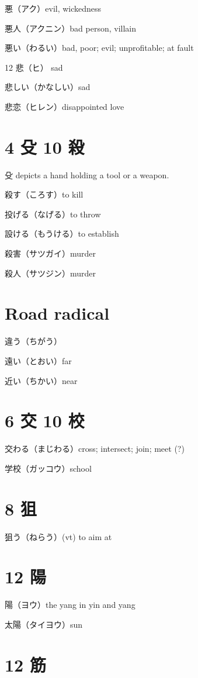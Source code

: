 悪（アク）evil, wickedness

悪人（アクニン）bad person, villain

悪い（わるい）bad, poor; evil; unprofitable; at fault

12 悲（ヒ） sad

悲しい（かなしい）sad

悲恋（ヒレン）disappointed love

\section{4 殳 10 殺}

殳 depicts a hand holding a tool or a weapon.

殺す（ころす）to kill

投げる（なげる）to throw

設ける（もうける）to establish

殺害（サツガイ）murder

殺人（サツジン）murder

\section{Road radical}

違う（ちがう）

遠い（とおい）far

近い（ちかい）near

\section{6 交 10 校}

交わる（まじわる）cross; intersect; join; meet (?)

学校（ガッコウ）school

\section{8 狙}

狙う（ねらう）(vt) to aim at

\section{12 陽}

陽（ヨウ）the yang in yin and yang

太陽（タイヨウ）sun

\section{12 筋}

